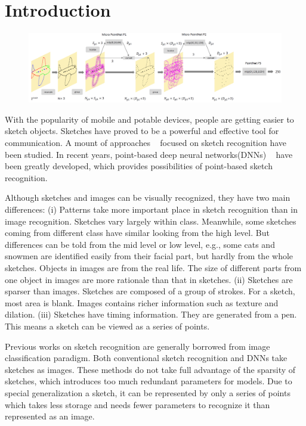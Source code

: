 \section{Introduction}
\label{sec:intro}

\begin{figure}
    \center
    \includegraphics[width=7in]{images/sketchpointnet.png}
    \label{fig:sketchpointnet}
\end{figure}

With the popularity of mobile and potable devices, people are getting easier to sketch objects. Sketches have proved to be a powerful and effective tool for communication. A mount of approaches ~\cite{Eitz2012HowDH, LiHSG15, Schneider2014SketchCA, Yu2015SketchaNetTB, Seddati2015DeepSketchDC, Dupont2016DeepSketch2D} focused on sketch recognition have been studied. In recent years, point-based deep neural networks(DNNs) ~\cite{qi2017pointnet, qi2017pointnetplusplus, 1801.07791} have been greatly developed, which provides possibilities of point-based sketch recognition.

Although sketches and images can be visually recognized, they have two main differences: (i) Patterns take more important place in sketch recognition than in image recognition. Sketches vary largely within class. Meanwhile, some sketches coming from different class have similar looking from the high level. But differences can be told from the mid level or low level, e.g., some cats and snowmen are identified easily from their facial part, but hardly from the whole sketches. Objects in images are from the real life. The size of different parts from one object in images are more rationale than that in sketches. (ii) Sketches are sparser than images. Sketches are composed of a group of strokes. For a sketch, most area is blank. Images contains richer information such as texture and dilation. (iii) Sketches have timing information. They are generated from a pen. This means a sketch can be viewed as a series of points.

Previous works on sketch recognition are generally borrowed from image classification paradigm. Both conventional sketch recognition and DNNs take sketches as images. These methods do not take full advantage of the sparsity of sketches, which introduces too much redundant parameters for models. Due to special generalization a sketch, it can be represented by only a series of points which takes less storage and needs fewer parameters to recognize it than represented as an image.


